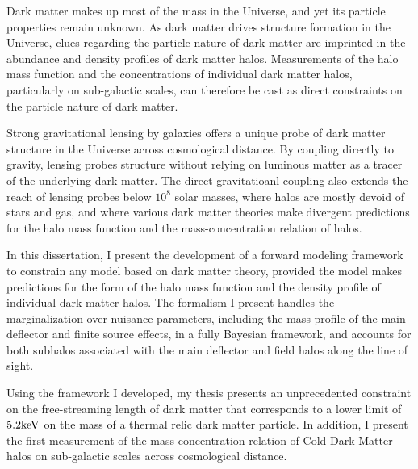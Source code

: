 Dark matter makes up most of the mass in the Universe, and yet its particle properties remain unknown. As dark matter drives structure formation in the Universe, clues regarding the particle nature of dark matter are imprinted in the abundance and density profiles of dark matter halos. Measurements of the halo mass function and the concentrations of individual dark matter halos, particularly on sub-galactic scales, can therefore be cast as direct constraints on the particle nature of dark matter.

Strong gravitational lensing by galaxies offers a unique probe of dark matter structure in the Universe across cosmological distance. By coupling directly to gravity, lensing probes structure without relying on luminous matter as a tracer of the underlying dark matter. The direct gravitatioanl coupling also extends the reach of lensing probes below $10^8$ solar masses, where halos are mostly devoid of stars and gas, and where various dark matter theories make divergent predictions for the halo mass function and the mass-concentration relation of halos. 

In this dissertation, I present the development of a forward modeling framework to constrain any model based on dark matter theory, provided the model makes predictions for the form of the halo mass function and the density profile of individual dark matter halos. The formalism I present handles the marginalization over nuisance parameters, including the mass profile of the main deflector and finite source effects, in a fully Bayesian framework, and accounts for both subhalos associated with the main deflector and field halos along the line of sight. 

Using the framework I developed, my thesis presents an unprecedented constraint on the free-streaming length of dark matter that corresponds to a lower limit of $5.2 \rm{keV}$ on the mass of a thermal relic dark matter particle. In addition, I present the first measurement of the mass-concentration relation of Cold Dark Matter halos on sub-galactic scales across cosmological distance. 